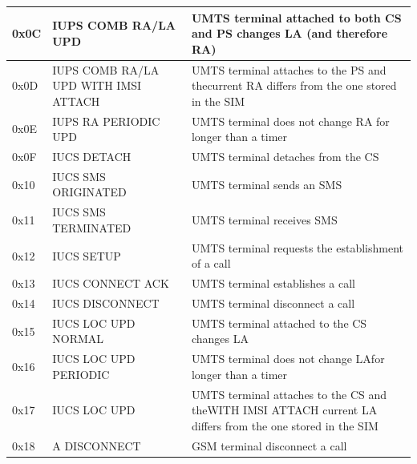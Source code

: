 {\begin{longtable}{|l|p{4cm}|p{8cm}|}
		0x0C         & IUPS COMB RA/LA UPD                  & UMTS terminal attached to both CS and PS changes LA (and therefore RA)                                     \\ \hline
		0x0D         & IUPS COMB RA/LA UPD WITH IMSI ATTACH & UMTS terminal attaches to the PS and thecurrent RA differs from the one stored in the SIM                  \\ \hline
		0x0E         & IUPS RA PERIODIC UPD                 & UMTS terminal does not change RA for longer than a timer                                                   \\ \hline
		0x0F         & IUCS DETACH                          & UMTS terminal detaches from the CS                                                                         \\ \hline
		0x10         & IUCS SMS ORIGINATED                  & UMTS terminal sends an SMS                                                                                 \\ \hline
		0x11         & IUCS SMS TERMINATED                  & UMTS terminal receives SMS                                                                                 \\ \hline
		0x12         & IUCS SETUP                           & UMTS terminal requests the establishment of a call                                                         \\ \hline
		0x13         & IUCS CONNECT ACK                     & UMTS terminal establishes a call                                                                           \\ \hline
		0x14         & IUCS DISCONNECT                      & UMTS terminal disconnect a call                                                                            \\ \hline
		0x15         & IUCS LOC UPD NORMAL                  & UMTS terminal attached to the CS changes LA                                                                \\ \hline
		0x16         & IUCS LOC UPD PERIODIC                & UMTS terminal does not change LAfor longer than a timer                                                    \\ \hline
		0x17         & IUCS LOC UPD                         & UMTS terminal attaches to the CS and theWITH IMSI ATTACH current LA differs from the one stored in the SIM \\ \hline
		0x18         & A DISCONNECT                         & GSM terminal disconnect a call                                                                             \\ \hline

\end{longtable}}
